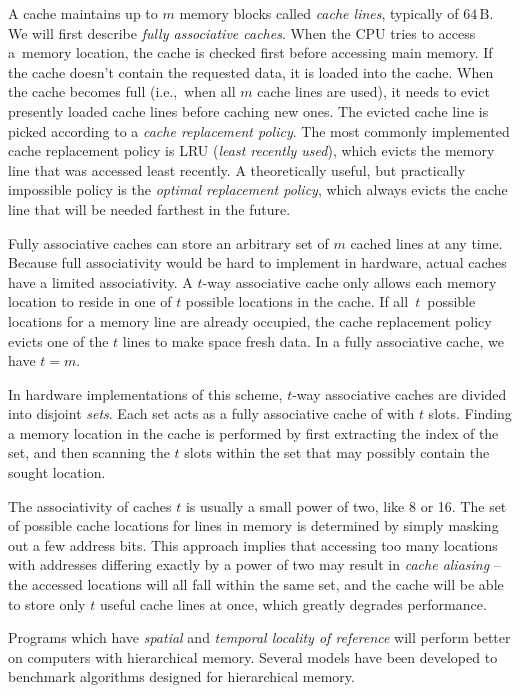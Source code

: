 A cache maintains up to $m$ memory blocks called \textit{cache lines},
typically of $64\,\text{B}$.
We will first describe \emph{fully associative caches}.
When the CPU tries to access a~memory location, the cache is checked first
before accessing main memory. If the cache doesn't contain the requested data,
it is loaded into the cache. When the cache becomes full (i.e.,\ when all $m$
cache lines are used), it needs to evict presently loaded cache lines before
caching new ones. The evicted cache line is picked according to a \emph{cache
replacement policy}. The most commonly implemented cache replacement policy is
LRU (\emph{least recently used}), which evicts the memory line that was
accessed least recently.
A theoretically useful, but practically impossible policy is the \emph{optimal
replacement policy}, which always evicts the cache line that will be needed
farthest in the future.

Fully associative caches can store an arbitrary set of $m$ cached lines
at any time. Because full associativity would be hard to implement in hardware,
actual caches have a limited associativity. A $t$-way associative
cache only allows each memory location to reside in one of $t$ possible
locations in the cache. If all~$t$~possible locations for a memory line
are already occupied, the cache replacement policy evicts one of the $t$
lines to make space fresh data. In a fully associative cache, we have $t=m$.

In hardware implementations of this scheme, $t$-way associative caches are
divided into disjoint \emph{sets}. Each set acts as a fully associative cache
of with $t$ slots.
Finding a memory location in the cache is performed by first extracting
the index of the set, and then scanning the $t$ slots within the set that
may possibly contain the sought location.

The associativity of caches $t$ is usually a small power of two, like 8 or 16.
The set of possible cache locations for lines in memory is determined
by simply masking out a few address bits. This approach implies that
accessing too many locations with addresses differing exactly by a power
of two may result in \emph{cache aliasing} -- the accessed locations will
all fall within the same set, and the cache will be able to store only
$t$ useful cache lines at once, which greatly degrades performance.

Programs which have \emph{spatial} and \emph{temporal locality of reference}
will perform better on computers with hierarchical memory. Several models have
been developed to benchmark algorithms designed for hierarchical memory.

